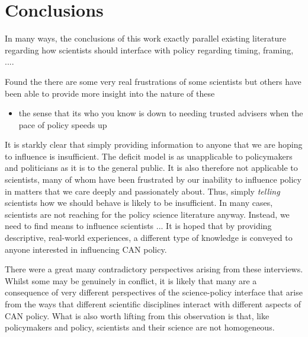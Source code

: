 \chapter{Conclusions}\label{ch:conclusions}

In many ways, the conclusions of this work exactly parallel existing literature regarding how scientists should interface with policy regarding timing, framing, ....

Found the there are some very real frustrations of some scientists but others have been able to provide more insight into the nature of these

\begin{itemize}
    \item the sense that its who you know is down to needing trusted advisers when the pace of policy speeds up 
    
\end{itemize}

It is starkly clear that simply providing information to anyone that we are hoping to influence is insufficient. The deficit model is as unapplicable to policymakers and politicians as it is to the general public. It is also therefore not applicable to scientists, many of whom have been frustrated by our inability to influence policy in matters that we care deeply and passionately about. Thus, simply \emph{telling} scientists how we should behave is likely to be insufficient. In many cases, scientists are not reaching for the policy science literature anyway. Instead, we need to find means to influence scientists ... It is hoped that by providing descriptive, real-world experiences, a different type of knowledge is conveyed to anyone interested in influencing CAN policy. 

There were a great many contradictory perspectives arising from these interviews. Whilst some may be genuinely in conflict, it is likely that many are a consequence of very different perspectives of the science-policy interface that arise from the ways that different scientific disciplines interact with different aspects of CAN policy. What is also worth lifting from this observation is that, like policymakers and policy, scientists and their science are not homogeneous.   
